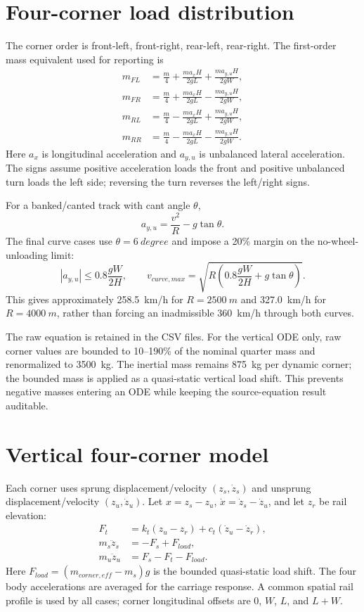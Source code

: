 \documentclass[11pt,a4paper]{article}
\begin{document}
\section{Four-corner load distribution}
The corner order is front-left, front-right, rear-left, rear-right. The first-order mass equivalent used for reporting is
\begin{align}
 m_{FL} &= \frac{m}{4}+\frac{m a_x H}{2gL}+\frac{m a_{y,u}H}{2gW},\\
 m_{FR} &= \frac{m}{4}+\frac{m a_x H}{2gL}-\frac{m a_{y,u}H}{2gW},\\
 m_{RL} &= \frac{m}{4}-\frac{m a_x H}{2gL}+\frac{m a_{y,u}H}{2gW},\\
 m_{RR} &= \frac{m}{4}-\frac{m a_x H}{2gL}-\frac{m a_{y,u}H}{2gW}.
\end{align}
Here $a_x$ is longitudinal acceleration and $a_{y,u}$ is unbalanced lateral acceleration. The signs assume positive acceleration loads the front and positive unbalanced turn loads the left side; reversing the turn reverses the left/right signs.

For a banked/canted track with cant angle $\theta$,
\begin{equation}
 a_{y,u}=\frac{v^2}{R}-g\tan\theta.
\end{equation}
The final curve cases use $\theta=\SI{6}{degree}$ and impose a 20\% margin on the no-wheel-unloading limit:
\begin{equation}
 |a_{y,u}| \leq 0.8\frac{gW}{2H},\qquad
 v_{curve,max}=\sqrt{R\left(0.8\frac{gW}{2H}+g\tan\theta\right)}.
\end{equation}
This gives approximately \SI{258.5}{km/h} for $R=\SI{2500}{m}$ and \SI{327.0}{km/h} for $R=\SI{4000}{m}$, rather than forcing an inadmissible \SI{360}{km/h} through both curves.

The raw equation is retained in the CSV files. For the vertical ODE only, raw corner values are bounded to 10--190\% of the nominal quarter mass and renormalized to \SI{3500}{kg}. The inertial mass remains \SI{875}{kg} per dynamic corner; the bounded mass is applied as a quasi-static vertical load shift. This prevents negative masses entering an ODE while keeping the source-equation result auditable.

\section{Vertical four-corner model}
Each corner uses sprung displacement/velocity $(z_s,\dot z_s)$ and unsprung displacement/velocity $(z_u,\dot z_u)$. Let $x=z_s-z_u$, $\dot x=\dot z_s-\dot z_u$, and let $z_r$ be rail elevation:
\begin{align}
 F_t &= k_t(z_u-z_r)+c_t(\dot z_u-\dot z_r),\\
 m_s\ddot z_s &= -F_s+F_{load},\\
 m_u\ddot z_u &= F_s-F_t-F_{load}.
\end{align}
Here $F_{load}=(m_{corner,eff}-m_s)g$ is the bounded quasi-static load shift. The four body accelerations are averaged for the carriage response. A common spatial rail profile is used by all cases; corner longitudinal offsets are $0$, $W$, $L$, and $L+W$.
\end{document}
